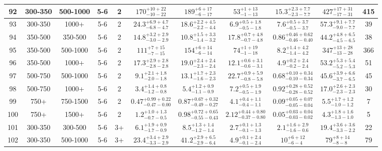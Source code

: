 \documentclass[11pt, oneside]{article}
\begin{document}
\begin{table}
{\begin{tabular}{ |c|c|c|c|c||c|c|c|c||c|c| }
92 & 300-350 & 500-1000 & 5-6 & 2 & $170^{+10+22}_{-10-22}$ & $189^{+ 6+17}_{- 6-17}$ & $53^{+ 1+13}_{- 1-13}$ & $15.3^{+2.3+7.7}_{-2.3-7.7}$ & $427^{+17+31}_{-17-31}$ & 415 \\ \hline
93 & 300-350 & 1000+ & 5-6 & 2 & $24.3^{+6.9+4.7}_{-6.8-4.7}$ & $18.6^{+2.2+4.5}_{-2.2-4.4}$ & $6.9^{+0.5+1.8}_{-0.5-1.8}$ & $7.6^{+0.5+3.7}_{-0.5-3.7}$ & $57.3^{+9.1+7.7}_{-9.0-7.7}$ & 39 \\ \hline
94 & 350-500 & 350-500 & 5-6 & 2 & $14.8^{+3.2+2.9}_{-3.0-2.9}$ & $10.8^{+1.5+3.3}_{-1.4-3.2}$ & $17.8^{+0.7+4.8}_{-0.7-4.8}$ & $0.86^{+0.46+0.62}_{-0.46-0.40}$ & $44.2^{+4.8+6.5}_{-4.5-6.5}$ & 38 \\ \hline
95 & 350-500 & 500-1000 & 5-6 & 2 & $111^{+ 7+15}_{- 7-15}$ & $154^{+ 6+14}_{- 6-14}$ & $74^{+ 1+19}_{- 1-18}$ & $8.2^{+1.4+4.2}_{-1.4-4.2}$ & $347^{+13+28}_{-13-28}$ & 366 \\ \hline
96 & 350-500 & 1000+ & 5-6 & 2 & $17.3^{+2.9+2.8}_{-2.8-2.8}$ & $19.0^{+2.4+2.4}_{-2.3-2.4}$ & $12.1^{+0.6+3.1}_{-0.6-3.1}$ & $4.9^{+0.2+2.4}_{-0.2-2.4}$ & $53.2^{+5.3+5.4}_{-5.2-5.3}$ & 51 \\ \hline
97 & 500-750 & 500-1000 & 5-6 & 2 & $9.1^{+2.1+1.8}_{-2.0-1.8}$ & $13.1^{+1.7+2.3}_{-1.6-2.3}$ & $22.7^{+0.9+5.9}_{-0.8-5.8}$ & $0.68^{+0.10+0.34}_{-0.10-0.34}$ & $45.6^{+3.9+6.6}_{-3.7-6.5}$ & 45 \\ \hline
98 & 500-750 & 1000+ & 5-6 & 2 & $3.4^{+1.4+0.8}_{-1.2-0.8}$ & $5.4^{+1.2+0.9}_{-1.1-0.9}$ & $7.2^{+0.5+1.9}_{-0.5-1.9}$ & $0.92^{+0.28+0.52}_{-0.28-0.52}$ & $17.0^{+2.6+2.3}_{-2.3-2.3}$ & 30 \\ \hline
99 & 750+ & 750-1500 & 5-6 & 2 & $0.47^{+0.99+0.22}_{-0.47-0.00}$ & $0.87^{+0.67+0.32}_{-0.49-0.27}$ & $4.1^{+0.4+1.1}_{-0.4-1.1}$ & $0.09^{+0.05+0.07}_{-0.05-0.04}$ & $5.5^{+1.7+1.2}_{-1.0-1.2}$ & 7 \\ \hline
100 & 750+ & 1500+ & 5-6 & 2 & $1.2^{+1.0+1.3}_{-0.7-0.5}$ & $0.98^{+0.72+0.65}_{-0.55-0.43}$ & $2.12^{+0.44+0.80}_{-0.37-0.80}$ & $0.05^{+0.03+0.04}_{-0.03-0.02}$ & $4.3^{+1.8+1.6}_{-1.3-1.0}$ & 5 \\ \hline
101 & 300-350 & 300-500 & 5-6 & 3+ & $6.1^{+1.9+0.9}_{-1.7-0.9}$ & $8.5^{+1.3+1.4}_{-1.2-1.4}$ & $2.7^{+0.1+1.3}_{-0.1-1.3}$ & $2.1^{+1.6+2.9}_{-1.6-0.6}$ & $19.4^{+3.6+3.6}_{-3.3-2.2}$ & 22 \\ \hline
102 & 300-350 & 500-1000 & 5-6 & 3+ & $23.4^{+3.4+2.9}_{-3.3-2.9}$ & $41.2^{+2.9+6.5}_{-2.9-6.4}$ & $4.9^{+0.1+2.4}_{-0.1-2.4}$ & $10^{+ 6+12}_{- 6- 4}$ & $79^{+ 8+14}_{- 8- 8}$ & 79 \\ \hline

\end{tabular}}
\end{table}
\end{document}
